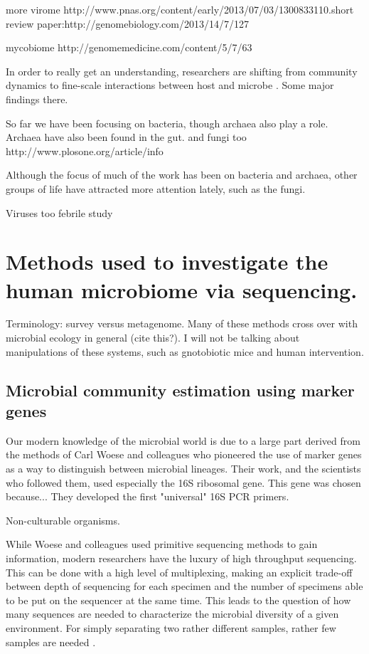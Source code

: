 \documentclass{amsart}
\begin{document}
more virome
http://www.pnas.org/content/early/2013/07/03/1300833110.short
review paper:http://genomebiology.com/2013/14/7/127

mycobiome
http://genomemedicine.com/content/5/7/63


In order to really get an understanding, researchers are shifting from community dynamics to fine-scale interactions between host and microbe \cite{hooper2012interactions}.
Some major findings there.

So far we have been focusing on bacteria, though archaea also play a role.
Archaea have also been found in the gut.
and fungi too
http://www.plosone.org/article/info%

Although the focus of much of the work has been on bacteria and archaea, other groups of life have attracted more attention lately, such as the fungi.

Viruses too
febrile study \cite{wylie2012sequence}


\section{Methods used to investigate the human microbiome via sequencing.}

Terminology: survey versus metagenome.
Many of these methods cross over with microbial ecology in general \citep{hugenholtz2002review} (cite this?).
I will not be talking about manipulations of these systems, such as gnotobiotic mice and human intervention.


\subsection{Microbial community estimation using marker genes}

Our modern knowledge of the microbial world is due to a large part derived from the methods of Carl Woese and colleagues who pioneered the use of marker genes as a way to distinguish between microbial lineages.
Their work, and the scientists who followed them, used especially the 16S ribosomal gene.
This gene was chosen because...
They developed the first "universal" 16S PCR primers.

Non-culturable organisms.

While Woese and colleagues used primitive sequencing methods to gain information, modern researchers have the luxury of high throughput sequencing.
This can be done with a high level of multiplexing, making an explicit trade-off between depth of sequencing for each specimen and the number of specimens able to be put on the sequencer at the same time.
This leads to the question of how many sequences are needed to characterize the microbial diversity of a given environment.
For simply separating two rather different samples, rather few samples are needed \cite{kuczynski2010microbial}.
\end{document}
